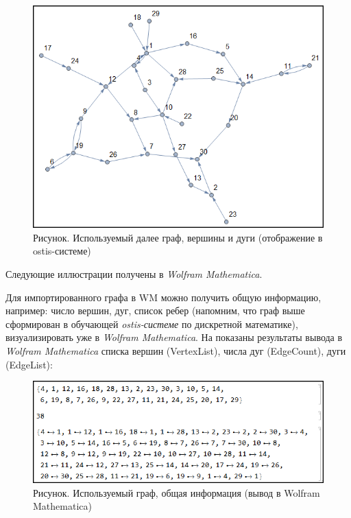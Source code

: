 
\begin{figure}[H]
	\includegraphics[scale=0.9]{images/part7/chapter_integration/integr_alg31.png}
	\caption{Рисунок. Используемый далее граф, вершины и дуги (отображение в  ostis-системе)}
	\label{fig:integr_alg31}
\end{figure}

Следующие иллюстрации получены в \textit{Wolfram Mathematica}. 

Для импортированного графа в WM можно получить общую информацию, например: число вершин, дуг, список ребер (напомним, что граф выше сформирован в обучающей \textit{ostis-системе} по дискретной математике), визуализировать уже в \textit{Wolfram Mathematica}. На \textit{}
показаны результаты вывода в \textit{Wolfram Mathematica} списка вершин (VertexList), числа дуг (EdgeCount), дуги (EdgeList):
\begin{figure}[H]
	\includegraphics[scale=0.65]{images/part7/chapter_integration/integr_alg31d.png}
	\caption{Рисунок. Используемый граф, общая информация (вывод в Wolfram Mathematica)}
	\label{fig:integr_alg31d}
\end{figure}

